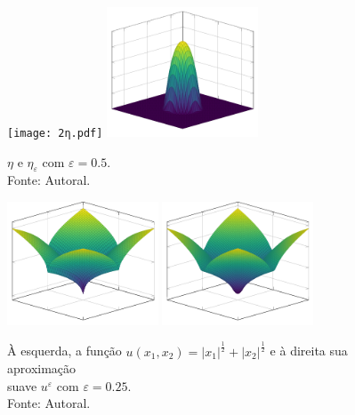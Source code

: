 \documentclass[a4paper, 11pt]{book}
\theoremstyle{definition}
\begin{document}
\begin{ex}
    \begin{figure}
        \centering
        \texttt{[image: 2η.pdf]}
        \hspace{10mm}
        \includegraphics[width=0.4\textwidth]{2ηε.pdf}
        \caption{$\eta$ e $\eta_\varepsilon$ com $\varepsilon = 0.5$.\\Fonte: Autoral.}
        \label{fig:eta-R2}
    \end{figure}

    \begin{figure}
        \centering
        \includegraphics[width=0.4\textwidth]{u.pdf}
        \hspace{10mm}
        \includegraphics[width=0.4\textwidth]{uε2.pdf}
        \caption{À esquerda, a função $u(x_1,x_2) = |x_1|^{\frac{1}{2}} + |x_2|^{\frac{1}{2}}$ e à direita sua aproximação\\suave $u^\varepsilon$ com $\varepsilon = 0.25$.\\Fonte: Autoral.}
        \label{fig:aproximacao-suave-R2}
    \end{figure}
\end{ex}
\end{document}
